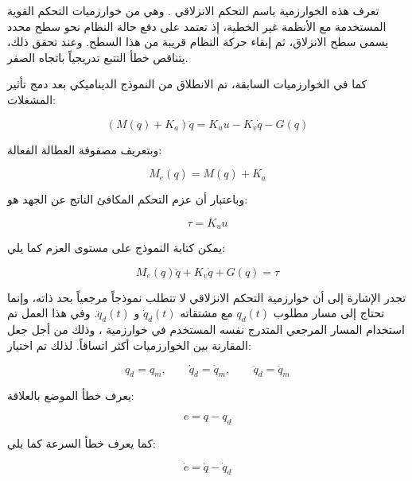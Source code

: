 تعرف هذه الخوارزمية باسم التحكم الانزلاقي . وهي من خوارزميات التحكم القوية المستخدمة مع الأنظمة غير الخطية، إذ تعتمد على دفع حالة النظام نحو سطح محدد يسمى سطح الانزلاق، ثم إبقاء حركة النظام قريبة من هذا السطح. وعند تحقق ذلك، يتناقص خطأ التتبع تدريجياً باتجاه الصفر.

كما في الخوارزميات السابقة، تم الانطلاق من النموذج الديناميكي بعد دمج تأثير المشغلات:

\begin{equation}
\left(M(q)+K_a\right)\ddot{q}
=
K_u u
-
K_v\dot{q}
-
G(q)
\label{eq:smc_dynamic_model_voltage}
\end{equation}

وبتعريف مصفوفة العطالة الفعالة:

\begin{equation}
M_e(q)=M(q)+K_a
\label{eq:smc_effective_inertia}
\end{equation}

وباعتبار أن عزم التحكم المكافئ الناتج عن الجهد هو:

\begin{equation}
\tau=K_u u
\label{eq:smc_torque_voltage_relation}
\end{equation}

يمكن كتابة النموذج على مستوى العزم كما يلي:

\begin{equation}
M_e(q)\ddot{q}
+
K_v\dot{q}
+
G(q)
=
\tau
\label{eq:smc_mechanical_model}
\end{equation}

تجدر الإشارة إلى أن خوارزمية التحكم الانزلاقي لا تتطلب نموذجاً مرجعياً بحد ذاته، وإنما تحتاج إلى مسار مطلوب \(q_d(t)\) مع مشتقاته \(\dot{q}_d(t)\) و \(\ddot{q}_d(t)\). وفي هذا العمل تم استخدام المسار المرجعي المتدرج نفسه المستخدم في خوارزمية ، وذلك من أجل جعل المقارنة بين الخوارزميات أكثر اتساقاً. لذلك تم اختيار:

\begin{equation}
q_d=q_m,
\qquad
\dot{q}_d=\dot{q}_m,
\qquad
\ddot{q}_d=\ddot{q}_m
\label{eq:smc_reference_choice}
\end{equation}

يعرف خطأ الموضع بالعلاقة:

\begin{equation}
e=q-q_d
\label{eq:smc_position_error}
\end{equation}

كما يعرف خطأ السرعة كما يلي:

\begin{equation}
\dot{e}=\dot{q}-\dot{q}_d
\label{eq:smc_velocity_error}
\end{equation}

